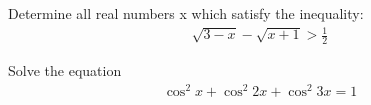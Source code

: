 
\item Determine all real numbers x which satisfy the inequality:
\begin{align*}
\sqrt{3-x}-\sqrt{x+1}>\frac{1}{2}
\end{align*}

\item Solve the equation
\begin{align*}
\cos^{2}x + \cos^{2}2x + \cos^{2}3x = 1
\end{align*}
